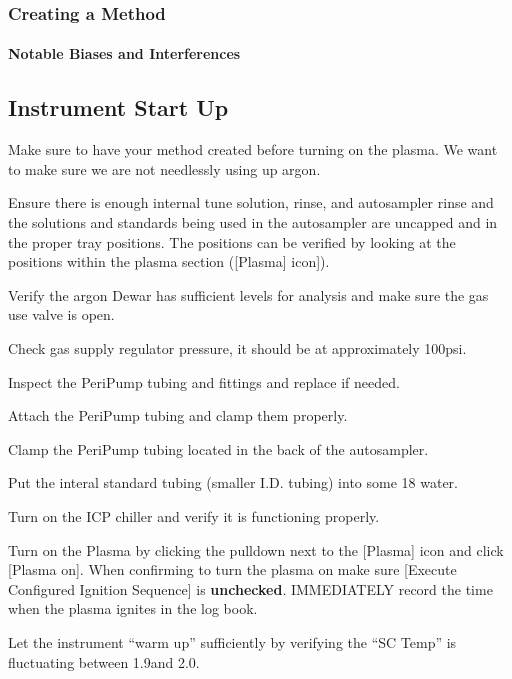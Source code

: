 \documentclass[12pt]{../SOP4_alpha}\usepackage[]{graphicx}\usepackage[]{color}
\begin{document}
\subsubsection{Creating a Method}

\paragraph{Notable Biases and Interferences}

\subsection{Instrument Start Up}

\NP Make sure to have your method created before turning on the plasma. We want to make sure we are not needlessly using up argon.

\NP Ensure there is enough internal tune solution, rinse, and autosampler rinse and the solutions and standards being used in the autosampler are uncapped and in the proper tray positions. The positions can be verified by looking at the positions within the plasma section ([Plasma] icon]).

\NP Verify the argon Dewar has sufficient levels for analysis and make sure the gas use valve is open.

\NP Check gas supply regulator pressure, it should be at approximately 100psi.

\NP Inspect the PeriPump tubing and fittings and replace if needed.

\NP Attach the PeriPump tubing and clamp them properly.



\NP Clamp the PeriPump tubing located in the back of the autosampler.

\NP Put the interal standard tubing (smaller I.D. tubing) into some 18 \ohm water.

\NP Turn on the ICP chiller and verify it is functioning properly.

\NP Turn on the Plasma by clicking the pulldown next to the [Plasma] icon and click [Plasma on]. When confirming to turn the plasma on make sure [Execute Configured Ignition Sequence] is \textbf{unchecked}. IMMEDIATELY record the time when the plasma ignites in the log book.

\NP Let the instrument ``warm up'' sufficiently by verifying the ``SC Temp'' is fluctuating between 1.9\celsius and 2.0\celsius.
\end{document}
